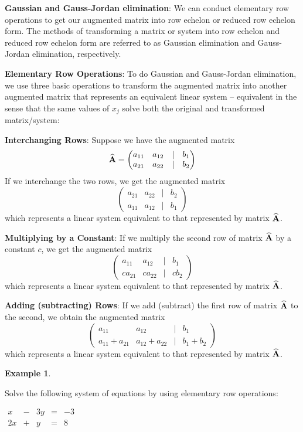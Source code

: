 \documentclass[
]{book}
\theoremstyle{definition}
\theoremstyle{definition}
\newtheorem{example}{Example}[chapter]
\theoremstyle{definition}
\theoremstyle{definition}
\theoremstyle{remark}
\begin{document}
\textbf{Gaussian and Gauss-Jordan elimination}: We can conduct elementary row operations to get our augmented matrix into row echelon or reduced row echelon form. The methods of transforming a matrix or system into row echelon and reduced row echelon form are referred to as Gaussian elimination and Gauss-Jordan elimination, respectively.

\textbf{Elementary Row Operations}: To do Gaussian and Gauss-Jordan elimination, we use three basic operations to transform the augmented matrix into another augmented matrix that represents an equivalent linear system -- equivalent in the sense that the same values of \(x_j\) solve both the original and transformed matrix/system:

\textbf{Interchanging Rows}: Suppose we have the augmented matrix
\[{\widehat{\bf A}}=\begin{pmatrix} a_{11} & a_{12} & | & b_1\\
            a_{21} & a_{22} & | & b_2 
            \end{pmatrix}\]
If we interchange the two rows, we get the augmented matrix
\[\begin{pmatrix}
            a_{21} & a_{22} & | & b_2\\
            a_{11} & a_{12} & | & b_1
            \end{pmatrix}\]
which represents a linear system equivalent to that represented by matrix \(\widehat{\bf A}\).

\textbf{Multiplying by a Constant}: If we multiply the second row of matrix \(\widehat{\bf A}\) by a constant \(c\), we get the augmented matrix
\[\begin{pmatrix}
            a_{11} & a_{12} & | & b_1\\
            c a_{21} & c a_{22} & | & c b_2
            \end{pmatrix}\]
which represents a linear system equivalent to that represented by matrix \(\widehat{\bf A}\).

\textbf{Adding (subtracting) Rows}: If we add (subtract) the first row of matrix \(\widehat{\bf A}\) to the second, we obtain the augmented matrix
\[\begin{pmatrix}
            a_{11} & a_{12} & | & b_1\\
            a_{11}+a_{21} & a_{12}+a_{22} & | & b_1+b_2
            \end{pmatrix}\]
which represents a linear system equivalent to that represented by matrix \(\widehat{\bf A}\).

\begin{example}
\protect\hypertarget{exm:solvesys}{}{\label{exm:solvesys} }

Solve the following system of equations by using elementary row operations:

\(\begin{matrix}  x & - & 3y & = & -3\\  2x & + & y & = & 8  \end{matrix}\)
\end{example}
\end{document}
